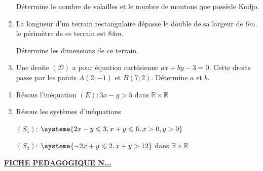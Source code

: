 \begin{multicols*}{2}
\begin{enumerate}
  		Détermine le nombre de volailles et le nombre de moutons que possède Kodjo.
  		\item La longueur d'un terrain rectangulaire dépasse le double de sa largeur de $6 m$. le périmètre de ce terrain est $84 m$.
  		
  		Détermine les dimensions de ce terrain.
  		\item   Une droite $(\mathcal{D})$ a pour équation cartésienne $ax+by-3=0$. Cette droite passe par les points $A(2;-1)$	 et $B(7;2)$. Détermine $a$ et $b$.
  	\end{enumerate}
  	\begin{center}
  	\end{center}
  	\begin{enumerate}
  		\item Résous l'inéquation   $(E): 3x-y>5$ dans $\mathbb{R}\times \mathbb{R}$
  		\item Résous les systèmes d'inéquations 
  		
  		$(S_{1})$: $\systeme{2x-y\leqslant3, x+y\leqslant6,x>0,y>0}$    
  		
  		$(S_{2})$: $\systeme{-2x+y\leqslant2, x+y>12 }$ dans $\mathbb{R}\times \mathbb{R}$
  	\end{enumerate}
  	
  \end{multicols*}
    \newpage
  \begin{center}
  	\underline{\textbf{\Large FICHE PEDAGOGIQUE N...}}
  \end{center}
